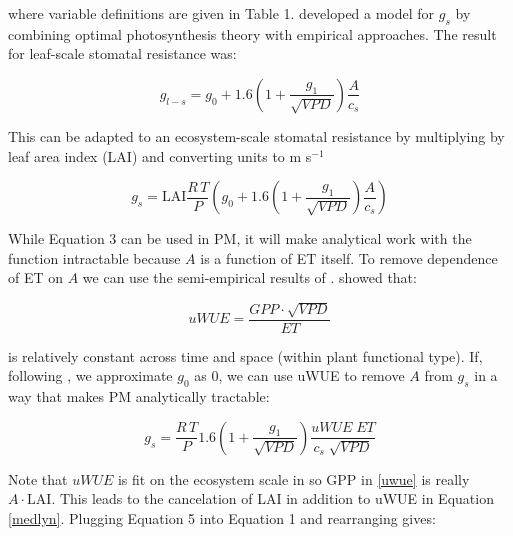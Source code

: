 \documentclass[draft,linenumbers]{agujournal}
\begin{document}
 where variable definitions are given in Table 1. \citet{MEDLYN_2011} developed a model for $g_s$ by combining optimal photosynthesis theory with empirical approaches. The result for leaf-scale stomatal resistance was:

\begin{linenomath*}
  \begin{equation}
  g_{l-s} = g_0 + 1.6 \left(1 + \frac{g_1}{\sqrt{VPD}}\right) \frac{A}{c_s}
  \end{equation}
\end{linenomath*}

This can be adapted to an ecosystem-scale stomatal resistance by multiplying by leaf area index (LAI) and converting units to m s$^{-1}$

\begin{linenomath*}
  \label{medlyn}
  \begin{equation}
  g_s = \text{LAI} \frac{R \,T}{P} \left( g_0 + 1.6 \left(1 + \frac{g_1}{\sqrt{VPD}}\right) \frac{A}{c_s}\right)
  \end{equation}
\end{linenomath*}

While Equation 3 can be used in PM, it will make analytical work with the function intractable because $A$ is a function of ET itself. To remove dependence of ET on $A$ we can use the semi-empirical results of \citet{Zhou_2015}. \citet{Zhou_2015} showed that:

\begin{linenomath*}
  \begin{equation}
    \label{uwue}
uWUE = \frac{GPP \cdot \sqrt{VPD}}{ET}
  \end{equation}
\end{linenomath*}
is relatively constant across time and space (within plant functional type). If, following \citet{Lin_2015}, we approximate $g_0$ as $0$, we can use uWUE to remove $A$ from $g_s$ in a way that makes PM analytically tractable:

\begin{linenomath*}
  \begin{equation}
  g_s = \frac{R \, T}{P} 1.6 \left(1 + \frac{g_1}{\sqrt{VPD}}\right) \frac{uWUE \; ET}{c_s \; \sqrt{VPD}}
  \end{equation}
\end{linenomath*}

Note that $uWUE$ is fit on the ecosystem scale in \citet{Zhou_2015} so GPP in \ref{uwue} is really $A\cdot \text{LAI}$. This leads to the cancelation of LAI in addition to uWUE in Equation \ref{medlyn}. Plugging Equation 5 into Equation 1 and rearranging gives:
\end{document}
